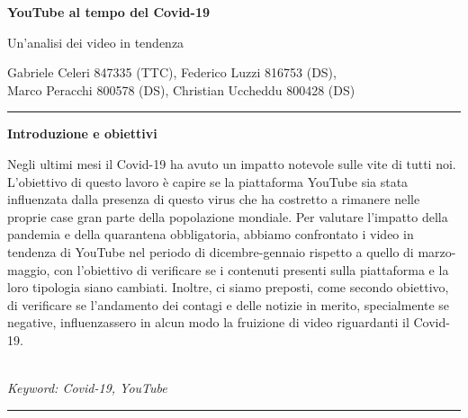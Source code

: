 \documentclass[10pt, a4paper,openany]{article}
\begin{document}
\begin{center}
\huge\textbf{YouTube al tempo del Covid-19}

Un'analisi dei video in tendenza
\end{center}

\begin{center}
Gabriele Celeri 847335 (TTC), Federico Luzzi 816753 (DS),\\  Marco Peracchi 800578 (DS), Christian Uccheddu 800428 (DS)
\end{center}

\hrule
\vspace{0.2cm}
\begin{center}\textbf{Introduzione e obiettivi}\end{center} 
Negli ultimi mesi il Covid-19 ha avuto un impatto notevole sulle vite di tutti noi. L'obiettivo di questo lavoro è capire se la piattaforma YouTube sia stata influenzata dalla presenza di questo virus che ha costretto a rimanere nelle proprie case gran parte della popolazione mondiale. 
Per valutare l'impatto della pandemia e della quarantena obbligatoria, abbiamo confrontato i video in tendenza di YouTube nel periodo di dicembre-gennaio rispetto a quello di marzo-maggio, con l'obiettivo di verificare se i contenuti presenti sulla piattaforma e la loro tipologia siano cambiati.
Inoltre, ci siamo preposti, come secondo obiettivo, di verificare se l'andamento dei contagi e delle notizie in merito, specialmente se negative, influenzassero in alcun modo la fruizione di video riguardanti il Covid-19.
\\\\ \begin{small}
	\textit{Keyword: Covid-19, YouTube}
\end{small}
\vspace{0.2cm}
\hrule



  
\end{document}
